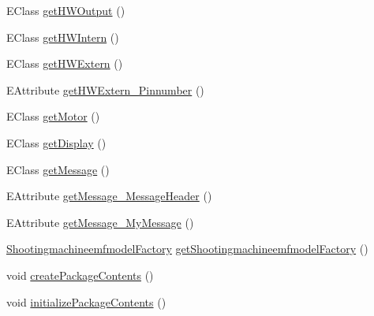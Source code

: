 \begin{DoxyCompactItemize}
\item 
E\-Class \hyperlink{classshootingmachineemfmodel_1_1impl_1_1_shootingmachineemfmodel_package_impl_ab435e9978a57a6482d01ba48fa8ca439}{get\-H\-W\-Output} ()
\item 
E\-Class \hyperlink{classshootingmachineemfmodel_1_1impl_1_1_shootingmachineemfmodel_package_impl_a4d79c0f3a00def45b86046e8908636e7}{get\-H\-W\-Intern} ()
\item 
E\-Class \hyperlink{classshootingmachineemfmodel_1_1impl_1_1_shootingmachineemfmodel_package_impl_aebd19ddfbfa5a16616e11c33e7d89eff}{get\-H\-W\-Extern} ()
\item 
E\-Attribute \hyperlink{classshootingmachineemfmodel_1_1impl_1_1_shootingmachineemfmodel_package_impl_a6150f0439546e113ac7b3f449ea00d2a}{get\-H\-W\-Extern\-\_\-\-Pinnumber} ()
\item 
E\-Class \hyperlink{classshootingmachineemfmodel_1_1impl_1_1_shootingmachineemfmodel_package_impl_a4821ab45885bc62267d5bb70879d0262}{get\-Motor} ()
\item 
E\-Class \hyperlink{classshootingmachineemfmodel_1_1impl_1_1_shootingmachineemfmodel_package_impl_aeb5fff339c8b842a0d511fa06ca98023}{get\-Display} ()
\item 
E\-Class \hyperlink{classshootingmachineemfmodel_1_1impl_1_1_shootingmachineemfmodel_package_impl_ac5110626e0726dd7b9161fc57637d468}{get\-Message} ()
\item 
E\-Attribute \hyperlink{classshootingmachineemfmodel_1_1impl_1_1_shootingmachineemfmodel_package_impl_a343ede636b6e2e081a16ecc59ba37003}{get\-Message\-\_\-\-Message\-Header} ()
\item 
E\-Attribute \hyperlink{classshootingmachineemfmodel_1_1impl_1_1_shootingmachineemfmodel_package_impl_acec8b4cb5d163ae789c807d9d103997a}{get\-Message\-\_\-\-My\-Message} ()
\item 
\hyperlink{interfaceshootingmachineemfmodel_1_1_shootingmachineemfmodel_factory}{Shootingmachineemfmodel\-Factory} \hyperlink{classshootingmachineemfmodel_1_1impl_1_1_shootingmachineemfmodel_package_impl_ab21ae664d72223f9534d424615a65cca}{get\-Shootingmachineemfmodel\-Factory} ()
\item 
void \hyperlink{classshootingmachineemfmodel_1_1impl_1_1_shootingmachineemfmodel_package_impl_a22d0d4e8c605fd051bb85c1512217c92}{create\-Package\-Contents} ()
\item 
void \hyperlink{classshootingmachineemfmodel_1_1impl_1_1_shootingmachineemfmodel_package_impl_a61beb648791a57eb0d018c70af85871d}{initialize\-Package\-Contents} ()
\end{DoxyCompactItemize}

